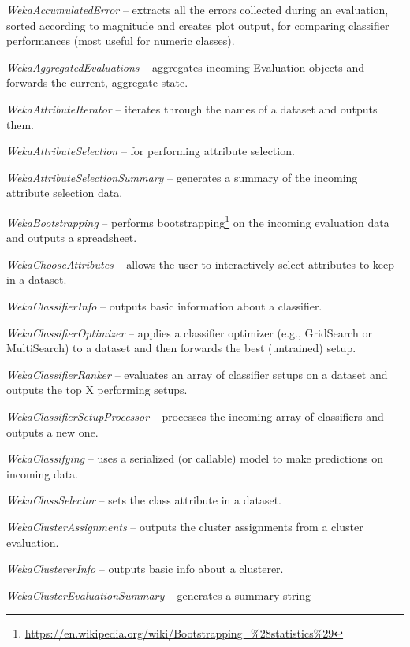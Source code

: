 \begin{tight_itemize}
	\item \textit{WekaAccumulatedError} -- extracts all the errors
	collected during an evaluation, sorted according to magnitude and
	creates plot output, for comparing classifier performances (most useful
	for numeric classes).
	\item \textit{WekaAggregatedEvaluations} -- aggregates incoming
	Evaluation objects and forwards the current, aggregate state. 
	\item \textit{WekaAttributeIterator} -- iterates through the names of a
	dataset and outputs them.
	\item \textit{WekaAttributeSelection} -- for performing attribute selection.
	\item \textit{WekaAttributeSelectionSummary} -- generates a summary of the
	incoming attribute selection data.
	\item \textit{WekaBootstrapping} -- performs bootstrapping\footnote{\url{https://en.wikipedia.org/wiki/Bootstrapping\_\%28statistics\%29}{}}
	on the incoming evaluation data and outputs a spreadsheet.
	\item \textit{WekaChooseAttributes} -- allows the user to interactively
	select attributes to keep in a dataset.
	\item \textit{WekaClassifierInfo} -- outputs basic information about
	a classifier.
	\item \textit{WekaClassifierOptimizer} -- applies a classifier optimizer
	(e.g., GridSearch or MultiSearch) to a dataset and then forwards the best
	(untrained) setup.
	\item \textit{WekaClassifierRanker} -- evaluates an array of classifier
	setups on a dataset and outputs the top X performing setups.
	\item \textit{WekaClassifierSetupProcessor} -- processes the incoming array
	of classifiers and outputs a new one.
	\item \textit{WekaClassifying} -- uses a serialized (or callable) model to
	make predictions on incoming data.
	\item \textit{WekaClassSelector} -- sets the class attribute in a dataset.
	\item \textit{WekaClusterAssignments} -- outputs the cluster assignments
	from a cluster evaluation.
	\item \textit{WekaClustererInfo} -- outputs basic info about a clusterer.
	\item \textit{WekaClusterEvaluationSummary} -- generates a summary string

\end{tight_itemize}
